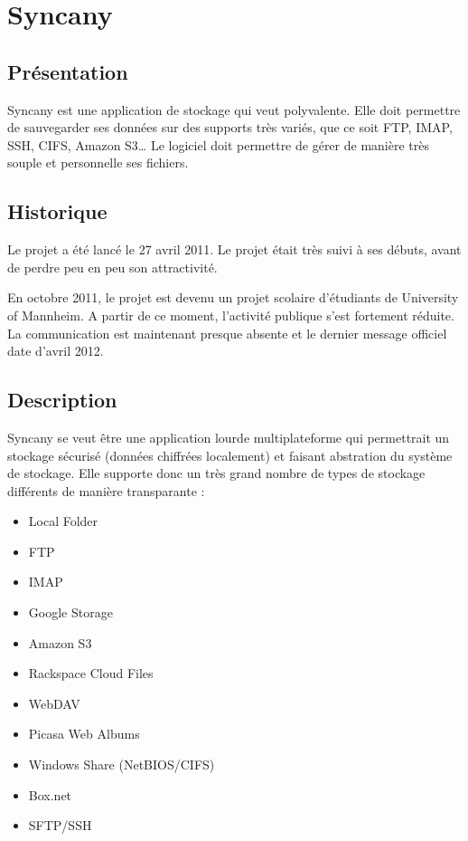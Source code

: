 \chapter{Syncany}
\thispagestyle{EIP} %
\section{Présentation}
Syncany est une application de stockage qui veut polyvalente. Elle doit permettre de sauvegarder ses données sur des supports très variés, que ce soit FTP, IMAP, SSH, CIFS, Amazon S3… Le logiciel doit permettre de gérer de manière très souple et personnelle ses fichiers.

\section{Historique}
Le projet a été lancé le 27 avril 2011. Le projet était très suivi à ses débuts, avant de perdre peu en peu son attractivité. 

En octobre 2011, le projet est devenu un projet scolaire d'étudiants de University of Mannheim. A partir de ce moment, l'activité publique s'est fortement réduite. La communication est maintenant presque absente et le dernier message officiel date d'avril 2012.

\section{Description}
Syncany se veut être une application lourde multiplateforme qui permettrait un stockage sécurisé (données chiffrées localement) et faisant abstration du système de stockage. Elle supporte donc un très grand nombre de types de stockage différents de manière transparante :

\begin{itemize}
\renewcommand{\labelitemi}{$\bullet$}
\item Local Folder
\item FTP
\item IMAP
\item Google Storage
\item Amazon S3
\item Rackspace Cloud Files
\item WebDAV
\item Picasa Web Albums
\item Windows Share (NetBIOS/CIFS)
\item Box.net
\item SFTP/SSH
\end{itemize}

